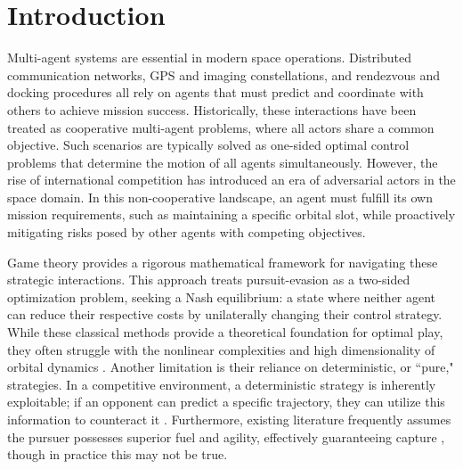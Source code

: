 \documentclass[letterpaper, 10 pt, conference]{ieeeconf}  %
\begin{document}
\section{Introduction}
\label{sec:intro}

%  
Multi-agent systems are essential in modern space operations. Distributed communication networks, GPS and imaging constellations, and rendezvous and docking procedures all rely on agents that must predict and coordinate with others to achieve mission success. Historically, these interactions have been treated as cooperative multi-agent problems, where all actors share a common objective. Such scenarios are typically solved as one-sided optimal control problems that determine the motion of all agents simultaneously. However, the rise of international competition has introduced an era of adversarial actors in the space domain. In this non-cooperative landscape, an agent must fulfill its own mission requirements, such as maintaining a specific orbital slot, while proactively mitigating risks posed by other agents with competing objectives.

Game theory provides a rigorous mathematical framework for navigating these strategic interactions. This approach treats pursuit-evasion as a two-sided optimization problem, seeking a Nash equilibrium: a state where neither agent can reduce their respective costs by unilaterally changing their control strategy. While these classical methods provide a theoretical foundation for optimal play, they often struggle with the nonlinear complexities and high dimensionality of orbital dynamics \cite{fu_analytical_2025} \cite{jia_approximate_2025}.
Another limitation is their reliance on deterministic, or ``pure," strategies. In a competitive environment, a deterministic strategy is inherently exploitable; if an opponent can predict a specific trajectory, they can utilize this information to counteract it \cite{peters2022learning}. Furthermore, existing literature frequently assumes the pursuer possesses superior fuel and agility, effectively guaranteeing capture \cite{venigalla2018spacecraft} \cite{pontani2009numerical}, though in practice this may not be true. 

\end{document}
